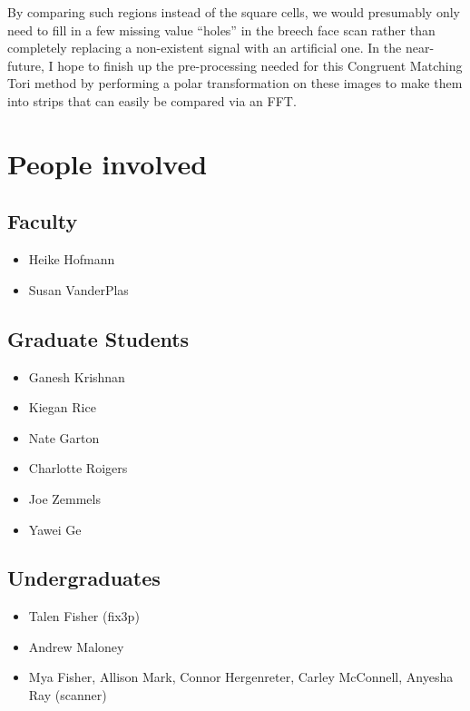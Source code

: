 \documentclass[]{book}
\providecommand{\tightlist}{%
  \setlength{\itemsep}{0pt}\setlength{\parskip}{0pt}}
\begin{document}
By comparing such regions instead of the square cells, we would presumably only need to fill in a few missing value ``holes'' in the breech face scan rather than completely replacing a non-existent signal with an artificial one. In the near-future, I hope to finish up the pre-processing needed for this Congruent Matching Tori method by performing a polar transformation on these images to make them into strips that can easily be compared via an FFT.

\hypertarget{people-involved}{%
\section{People involved}\label{people-involved}}

\hypertarget{faculty}{%
\subsection{Faculty}\label{faculty}}

\begin{itemize}
\tightlist
\item
  Heike Hofmann
\item
  Susan VanderPlas
\end{itemize}

\hypertarget{graduate-students}{%
\subsection{Graduate Students}\label{graduate-students}}

\begin{itemize}
\tightlist
\item
  Ganesh Krishnan
\item
  Kiegan Rice
\item
  Nate Garton
\item
  Charlotte Roigers
\item
  Joe Zemmels
\item
  Yawei Ge
\end{itemize}

\hypertarget{undergraduates}{%
\subsection{Undergraduates}\label{undergraduates}}

\begin{itemize}
\tightlist
\item
  Talen Fisher (fix3p)
\item
  Andrew Maloney
\item
  Mya Fisher, Allison Mark, Connor Hergenreter, Carley McConnell, Anyesha Ray (scanner)
\end{itemize}
\end{document}
